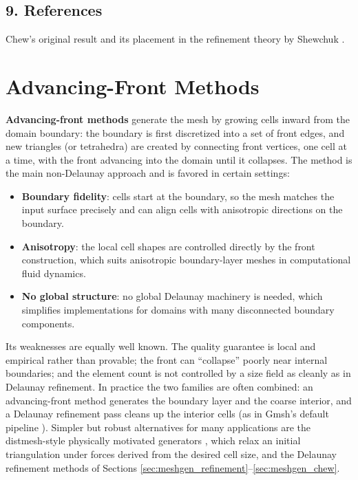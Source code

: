 \subsection{9. References}

Chew's original result \cite{chew1989} and its placement in the refinement
theory by Shewchuk \cite{shewchuk2002}.

\section{Advancing-Front Methods}
\label{sec:meshgen_advancing_front}

\textbf{Advancing-front methods} generate the mesh
by growing cells inward from the domain boundary: the boundary is first
discretized into a set of front edges, and new triangles (or tetrahedra)
are created by connecting front vertices, one cell at a time, with the
front advancing into the domain until it collapses. The method is the
main non-Delaunay approach and is favored in certain settings:

\begin{itemize}
  \item \textbf{Boundary fidelity}: cells start at the boundary, so the
    mesh matches the input surface precisely and can align cells with
    anisotropic directions on the boundary.
  \item \textbf{Anisotropy}: the local cell shapes are controlled directly
    by the front construction, which suits anisotropic boundary-layer
    meshes in computational fluid dynamics.
  \item \textbf{No global structure}: no global Delaunay machinery is
    needed, which simplifies implementations for domains with many
    disconnected boundary components.
\end{itemize}

Its weaknesses are equally well known. The quality guarantee is local and
empirical rather than provable; the front can ``collapse'' poorly near
internal boundaries; and the element count is not controlled by a size
field as cleanly as in Delaunay refinement. In practice the two families
are often combined: an advancing-front method generates the boundary layer
and the coarse interior, and a Delaunay refinement pass cleans up the
interior cells (as in Gmsh's default pipeline \cite{geuzaine2009}).
Simpler but robust alternatives for many applications are the
distmesh-style physically motivated generators \cite{persson2004}, which
relax an initial triangulation under forces derived from the desired cell
size, and the Delaunay refinement methods of Sections
\ref{sec:meshgen_refinement}--\ref{sec:meshgen_chew}.

